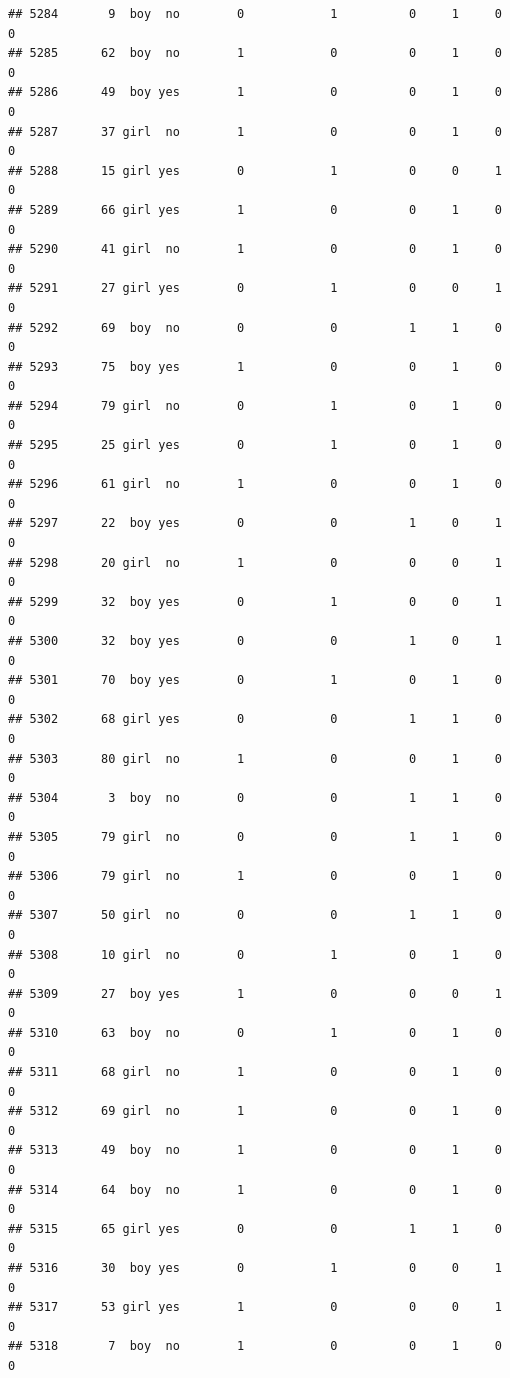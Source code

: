 \documentclass[man]{apa6}
\begin{document}
\begin{verbatim}
## 5284       9  boy  no        0            1          0     1     0     0
## 5285      62  boy  no        1            0          0     1     0     0
## 5286      49  boy yes        1            0          0     1     0     0
## 5287      37 girl  no        1            0          0     1     0     0
## 5288      15 girl yes        0            1          0     0     1     0
## 5289      66 girl yes        1            0          0     1     0     0
## 5290      41 girl  no        1            0          0     1     0     0
## 5291      27 girl yes        0            1          0     0     1     0
## 5292      69  boy  no        0            0          1     1     0     0
## 5293      75  boy yes        1            0          0     1     0     0
## 5294      79 girl  no        0            1          0     1     0     0
## 5295      25 girl yes        0            1          0     1     0     0
## 5296      61 girl  no        1            0          0     1     0     0
## 5297      22  boy yes        0            0          1     0     1     0
## 5298      20 girl  no        1            0          0     0     1     0
## 5299      32  boy yes        0            1          0     0     1     0
## 5300      32  boy yes        0            0          1     0     1     0
## 5301      70  boy yes        0            1          0     1     0     0
## 5302      68 girl yes        0            0          1     1     0     0
## 5303      80 girl  no        1            0          0     1     0     0
## 5304       3  boy  no        0            0          1     1     0     0
## 5305      79 girl  no        0            0          1     1     0     0
## 5306      79 girl  no        1            0          0     1     0     0
## 5307      50 girl  no        0            0          1     1     0     0
## 5308      10 girl  no        0            1          0     1     0     0
## 5309      27  boy yes        1            0          0     0     1     0
## 5310      63  boy  no        0            1          0     1     0     0
## 5311      68 girl  no        1            0          0     1     0     0
## 5312      69 girl  no        1            0          0     1     0     0
## 5313      49  boy  no        1            0          0     1     0     0
## 5314      64  boy  no        1            0          0     1     0     0
## 5315      65 girl yes        0            0          1     1     0     0
## 5316      30  boy yes        0            1          0     0     1     0
## 5317      53 girl yes        1            0          0     0     1     0
## 5318       7  boy  no        1            0          0     1     0     0

\end{verbatim}
\end{document}

